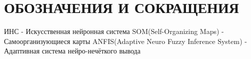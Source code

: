 \section*{ОБОЗНАЧЕНИЯ И СОКРАЩЕНИЯ}

ИНС - Искусственная нейронная система
SOM(Self-Organizing Maps) - Самоорганизующиеся карты
ANFIS(Adaptive Neuro Fuzzy Inference System) - Адаптивная система нейро-нечёткого вывода
